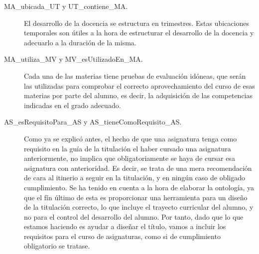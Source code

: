 \begin{description}
		\item[MA\_ubicada\_UT y UT\_contiene\_MA.] El desarrollo de la docencia se estructura en trimestres. Estas ubicaciones temporales son útiles a la hora de estructurar el desarrollo de la docencia y adecuarlo a la duración de la misma.
		
        
    				
		\item[MA\_utiliza\_MV y MV\_esUtilizadoEn\_MA.] Cada una de las materias tiene pruebas de evaluación idóneas, que serán las utilizadas para comprobar el correcto aprovechamiento del curso de esas materias por parte del alumno, es decir, la adquisición de las competencias indicadas en el grado adecuado.
		
        

    		\item [AS\_esRequisitoPara\_AS y AS\_tieneComoRequisito\_AS.] Como ya se explicó antes, el hecho de que una asignatura tenga como requisito en la guía de la titulación el haber cursado una asignatura anteriormente, no implica que obligatoriamente se haya de cursar esa asignatura con anterioridad. Es decir, se trata de una mera recomendación de cara al itinerio a seguir en la titulación, y en ningún caso de obligado cumplimiento. Se ha tenido en cuenta a la hora de elaborar la ontología, ya que el fín último de esta es proporcionar una herramienta para un diseño de la titulación correcto, lo que incluye el trayecto curricular del alumno, y no para el control del desarrollo del alumno. Por tanto, dado que lo que estamos haciendo es ayudar a diseñar el título, vamos a incluir los requisitos para el curso de asignaturas, como si de cumplimiento obligatorio se tratase.
    		

\end{description}
